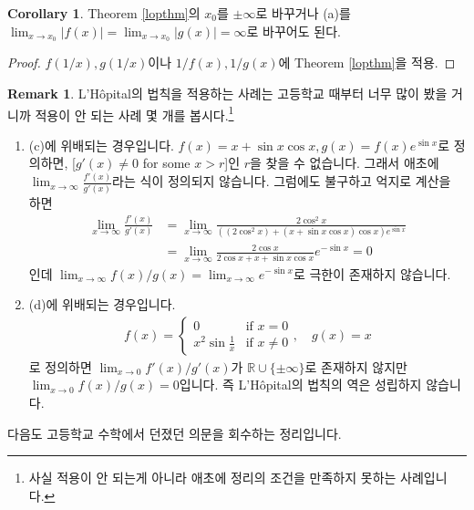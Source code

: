 \documentclass[12pt]{article}
\theoremstyle{definition}
\newtheorem{cor}[thm]{Corollary}
\newtheorem*{rem}{Remark}
\def\RR{\mathbb{R}}
\newcommand{\abs}[1]{\left\vert#1\right\vert}
\begin{document}
\begin{cor} \label{cor lpt}
	Theorem \ref{lopthm}의 \(x_0\)를 \(\pm \infty\)로 바꾸거나 (a)를 \(\lim_{x \rightarrow x_0} \abs{f(x)} = \lim_{x \rightarrow x_0} \abs{g(x)} = \infty\)로 바꾸어도 된다.
\end{cor}
\begin{proof}
	\(f(1/x), g(1/x)\)이나 \(1/f(x), 1/g(x)\)에 Theorem \ref{lopthm}을 적용.
\end{proof}

\begin{rem}
	L'H\^opital의 법칙을 적용하는 사례는 고등학교 때부터 너무 많이 봤을 거니까 적용이 안 되는 사례 몇 개를 봅시다.\footnote{사실 적용이 안 되는게 아니라 애초에 정리의 조건을 만족하지 못하는 사례입니다.}
	\begin{enumerate} [label=(\alph*), leftmargin=2\parindent]
		\item
		(c)에 위배되는 경우입니다. \(f(x) = x + \sin x \cos x, g(x) = f(x) e^{\sin x}\)로 정의하면, [\(g'(x) \neq 0\) for some \(x > r\)]인 \(r\)을 찾을 수 없습니다. 그래서 애초에 \(\lim_{x \rightarrow \infty} \frac{f'(x)}{g'(x)}\)라는 식이 정의되지 않습니다. 그럼에도 불구하고 억지로 계산을 하면 
		\begin{align*}
			\lim_{x \rightarrow \infty} \frac{f'(x)}{g'(x)} &= \lim_{x \rightarrow \infty} \frac{2\cos^2 x}{((2 \cos^2 x) + (x + \sin x \cos x)\cos x) e^{\sin x}}\\
			&= \lim_{x \rightarrow \infty} \frac{2\cos x}{2 \cos x + x + \sin x \cos x}e^{-\sin x} = 0
		\end{align*}
		인데 \(\lim_{x \rightarrow \infty} f(x)/g(x) = \lim_{x \rightarrow \infty} e^{-\sin x}\)로 극한이 존재하지 않습니다.
		\item
		(d)에 위배되는 경우입니다.
		\begin{gather*}
			f(x) =
			\begin{cases}
				0 &\text{if } x = 0\\
				x^2 \sin \frac{1}{x} &\text{if } x \neq 0
			\end{cases}
			, \quad g(x) = x
		\end{gather*}
		로 정의하면 \(\lim_{x \rightarrow 0} f'(x)/g'(x)\)가 \(\RR \cup \{\pm \infty\}\)로 존재하지 않지만 \(\lim_{x \rightarrow 0} f(x)/g(x) = 0\)입니다. 즉 L'H\^opital의 법칙의 역은 성립하지 않습니다.
	\end{enumerate}
\end{rem}

다음도 고등학교 수학에서 던졌던 의문을 회수하는 정리입니다.
\end{document}
